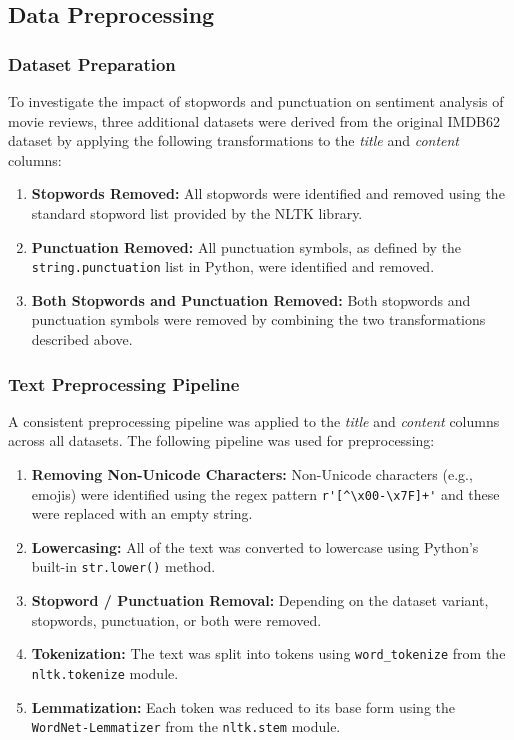 \documentclass[a4paper,10pt]{article}
\begin{document}
\subsection{Data Preprocessing}
\subsubsection{Dataset Preparation}

To investigate the impact of stopwords and punctuation on sentiment analysis of movie reviews, three additional datasets were derived from the original IMDB62 dataset by applying the following transformations to the \emph{title} and \emph{content} columns:

\begin{enumerate}
    \item \textbf{Stopwords Removed:} All stopwords were identified and removed using the standard stopword list provided by the NLTK library.
    \item \textbf{Punctuation Removed:} All punctuation symbols, as defined by the \texttt{string.punctuation} list in Python, were identified and removed.
    \item \textbf{Both Stopwords and Punctuation Removed:} Both stopwords and punctuation symbols were removed by combining the two transformations described above.
\end{enumerate}

\subsubsection{Text Preprocessing Pipeline}

A consistent preprocessing pipeline was applied to the \emph{title} and \emph{content} columns across all datasets. The following pipeline was used for preprocessing:

\begin{enumerate}
    \item \textbf{Removing Non-Unicode Characters:} Non-Unicode characters (e.g., emojis) were identified using the regex pattern \verb|r'[^\x00-\x7F]+'| and these were replaced with an empty string.
    \item \textbf{Lowercasing:} All of the text was converted to lowercase using Python's built-in \verb|str.lower()| method.
    \item \textbf{Stopword / Punctuation Removal:} Depending on the dataset variant, stopwords, punctuation, or both were removed.
    \item \textbf{Tokenization:} The text was split into tokens using \texttt{word\_tokenize} from the \texttt{nltk.tokenize} module.
    \item \textbf{Lemmatization:} Each token was reduced to its base form using the \texttt{WordNet-Lemmatizer} from the \texttt{nltk.stem} module.
\end{enumerate}
\end{document}
